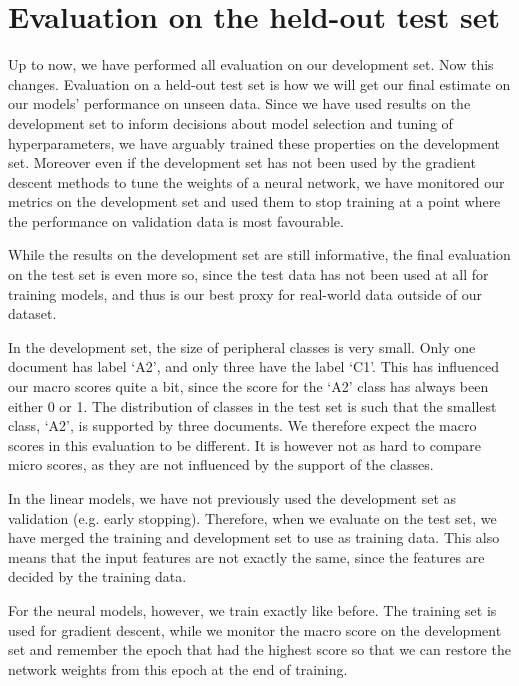\chapter{Evaluation on the held-out test set}

Up to now, we have performed all evaluation on our development set. Now this
changes. Evaluation on a held-out test set is how we will get our final
estimate on our models' performance on unseen data. Since we have used
results on the development set to inform decisions about model selection and
tuning of hyperparameters, we have arguably trained these properties on the
development set. Moreover even if the development set has not been used by
the gradient descent methods to tune the weights of a neural network, we have
monitored our metrics on the development set and used them to stop training
at a point where the performance on validation data is most favourable.

While the results on the development set are still informative, the final
evaluation on the test set is even more so, since the test data has not been
used at all for training models, and thus is our best proxy for real-world
data outside of our dataset.

In the development set, the size of peripheral classes is very small. Only
one document has label `A2', and only three have the label `C1'. This has
influenced our macro \FI scores quite a bit, since the \FI score for the `A2'
class has always been either 0 or 1. The distribution of classes in the test
set is such that the smallest class, `A2', is supported by three documents.
We therefore expect the macro \FI scores in this evaluation to be different.
It is however not as hard to compare micro \FI scores, as they are not
influenced by the support of the classes.

In the linear models, we have not previously used the development set as
validation (e.g. early stopping). Therefore, when we evaluate on the test
set, we have merged the training and development set to use as training data.
This also means that the input features are not exactly the same, since the
features are decided by the training data.

For the neural models, however, we train exactly like before. The training
set is used for gradient descent, while we monitor the macro \FI score on the
development set and remember the epoch that had the highest \FI score so that
we can restore the network weights from this epoch at the end of training.

